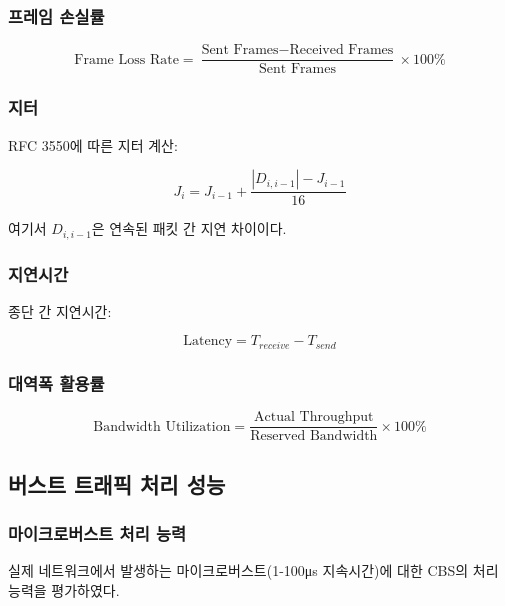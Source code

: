 \documentclass[twocolumn,10pt]{article}
\begin{document}
\subsubsection{프레임 손실률}

\begin{equation}
\text{Frame Loss Rate} = \frac{\text{Sent Frames} - \text{Received Frames}}{\text{Sent Frames}} \times 100\%
\end{equation}

\subsubsection{지터}

RFC 3550에 따른 지터 계산:

\begin{equation}
J_i = J_{i-1} + \frac{|D_{i,i-1}| - J_{i-1}}{16}
\end{equation}

여기서 $D_{i,i-1}$은 연속된 패킷 간 지연 차이이다.

\subsubsection{지연시간}

종단 간 지연시간:

\begin{equation}
\text{Latency} = T_{receive} - T_{send}
\end{equation}

\subsubsection{대역폭 활용률}

\begin{equation}
\text{Bandwidth Utilization} = \frac{\text{Actual Throughput}}{\text{Reserved Bandwidth}} \times 100\%
\end{equation}

\subsection{버스트 트래픽 처리 성능}

\subsubsection{마이크로버스트 처리 능력}

실제 네트워크에서 발생하는 마이크로버스트(1-100μs 지속시간)에 대한 CBS의 처리 능력을 평가하였다.
\end{document}
